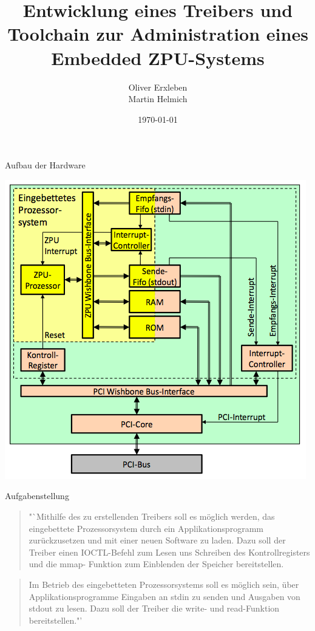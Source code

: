 \documentclass[10pt]{beamer}
\title{Entwicklung eines Treibers und Toolchain zur Administration eines Embedded ZPU-Systems}
\author{Oliver Erxleben\\Martin Helmich}
\institute{Hochschule Osnabrück}
\date{\today}
\begin{document}
	\frame{\titlepage}
	
	\begin{frame}{Aufbau der Hardware}
		\begin{center}
		\includegraphics[height=0.9\textheight]{images/zpu_architecture.png}
		\end{center}
	\end{frame}
	
	\begin{frame}{Aufgabenstellung}
		\begin{quote}
			"`Mithilfe des zu erstellenden Treibers soll es möglich werden, das eingebettete Prozessorsystem durch ein Applikationsprogramm zurückzusetzen und mit einer neuen Software zu laden. Dazu soll der Treiber einen IOCTL-Befehl zum Lesen uns Schreiben des Kontrollregisters und die mmap- Funktion zum Einblenden der Speicher bereitstellen.
		\end{quote}
			
		\begin{quote}
			Im Betrieb des eingebetteten Prozessorsystems soll es möglich sein, über Applikationsprogramme Eingaben an stdin zu senden und Ausgaben von stdout zu lesen. Dazu soll der Treiber die write- und read-Funktion bereitstellen."'
		\end{quote}
	\end{frame}
	
\end{document}
